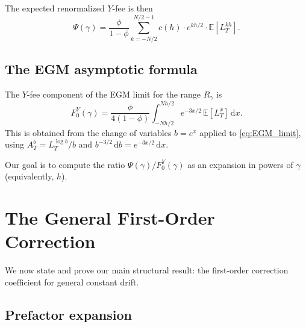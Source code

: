 \documentclass[11pt]{article}
\theoremstyle{definition}
\theoremstyle{remark}
\newcommand{\E}{\mathbb{E}}
\newcommand{\dd}{\,\mathrm{d}}
\begin{document}
The expected renormalized $Y$-fee is then
\begin{equation}\label{eq:Psi_def}
\Psi(\gamma) = \frac{\phi}{1 - \phi}
\sum_{k=-N/2}^{N/2-1} c(h) \cdot e^{kh/2} \cdot \E[L^{kh}_T].
\end{equation}

\subsection{The EGM asymptotic formula}

The $Y$-fee component of the EGM limit for the range $R_\gamma$ is
\begin{equation}\label{eq:F0Y}
F_0^Y(\gamma) = \frac{\phi}{4(1 - \phi)}
\int_{-Nh/2}^{Nh/2} e^{-3x/2}\,\E[L^x_T]\dd x.
\end{equation}
This is obtained from the change of variables $b = e^x$ applied to
\eqref{eq:EGM_limit}, using $A^b_T = L^{\log b}_T/b$ and
$b^{-3/2}\dd b = e^{-3x/2}\dd x$.

Our goal is to compute the ratio $\Psi(\gamma)/F_0^Y(\gamma)$ as an
expansion in powers of $\gamma$ (equivalently, $h$).

\section{The General First-Order Correction}\label{sec:general_correction}

We now state and prove our main structural result: the first-order
correction coefficient for general constant drift.

\subsection{Prefactor expansion}
\end{document}

